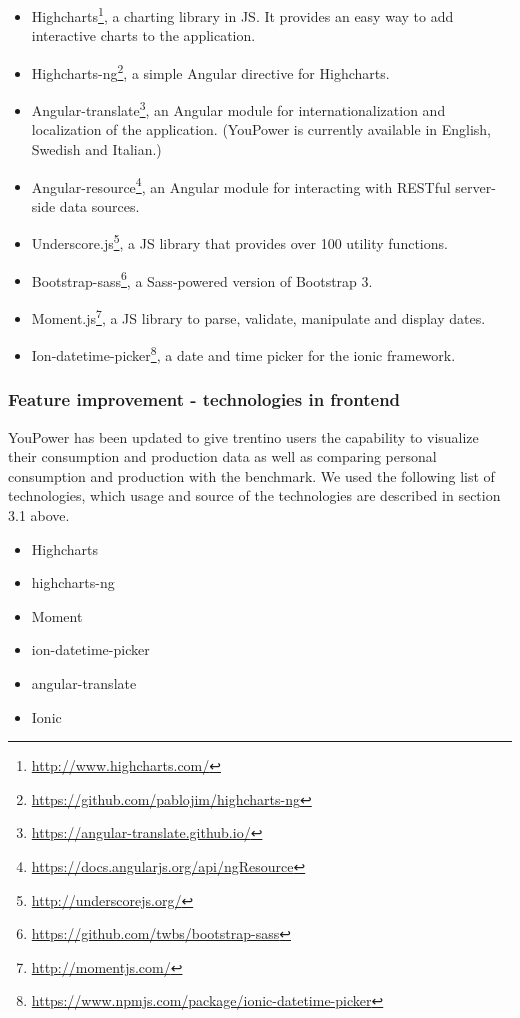 \begin{itemize}

\item Highcharts\footnote{\url{http://www.highcharts.com/}}, a charting library in JS. It provides an easy way to add interactive charts to the application. 

\item Highcharts-ng\footnote{\url{https://github.com/pablojim/highcharts-ng}}, a simple Angular directive for Highcharts. 

\item Angular-translate\footnote{\url{https://angular-translate.github.io/}}, an Angular module for internationalization and localization of the application. (YouPower is currently available in English, Swedish and Italian.)

\item Angular-resource\footnote{\url{https://docs.angularjs.org/api/ngResource}}, an Angular module for interacting with RESTful server-side data sources. 

\item Underscore.js\footnote{\url{http://underscorejs.org/}}, a JS library that provides over 100 utility functions. 

\item Bootstrap-sass\footnote{\url{https://github.com/twbs/bootstrap-sass}}, a Sass-powered version of Bootstrap 3. 

\item Moment.js\footnote{\url{http://momentjs.com/}}, a JS library to parse, validate, manipulate and display dates. 

\item Ion-datetime-picker\footnote{\url{https://www.npmjs.com/package/ionic-datetime-picker}}, a date and time picker for the ionic framework. 

\end{itemize}
\subsubsection{Feature improvement - technologies in frontend}
YouPower has been updated to give trentino users the capability to visualize their consumption and production data as well as comparing personal consumption and production with the benchmark. We used the following list of technologies, which usage and source of the technologies are described in section 3.1 above. 
\begin{itemize}
\item Highcharts
\item highcharts-ng
\item Moment
\item ion-datetime-picker
\item angular-translate
\item Ionic
\end{itemize}
